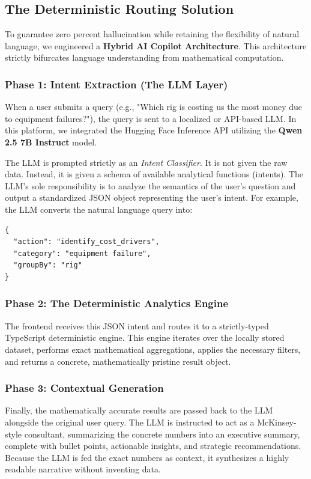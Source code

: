 \documentclass[11pt,a4paper]{article}
\begin{document}
\subsection{The Deterministic Routing Solution}
To guarantee zero percent hallucination while retaining the flexibility of natural language, we engineered a \textbf{Hybrid AI Copilot Architecture}. This architecture strictly bifurcates language understanding from mathematical computation.

\subsubsection{Phase 1: Intent Extraction (The LLM Layer)}
When a user submits a query (e.g., "Which rig is costing us the most money due to equipment failures?"), the query is sent to a localized or API-based LLM. In this platform, we integrated the Hugging Face Inference API utilizing the \textbf{Qwen 2.5 7B Instruct} model. 

The LLM is prompted strictly as an \textit{Intent Classifier}. It is not given the raw data. Instead, it is given a schema of available analytical functions (intents). The LLM's sole responsibility is to analyze the semantics of the user's question and output a standardized JSON object representing the user's intent. 
For example, the LLM converts the natural language query into:
\begin{verbatim}
{
  "action": "identify_cost_drivers",
  "category": "equipment failure",
  "groupBy": "rig"
}
\end{verbatim}

\subsubsection{Phase 2: The Deterministic Analytics Engine}
The frontend receives this JSON intent and routes it to a strictly-typed TypeScript deterministic engine. This engine iterates over the locally stored dataset, performs exact mathematical aggregations, applies the necessary filters, and returns a concrete, mathematically pristine result object.

\subsubsection{Phase 3: Contextual Generation}
Finally, the mathematically accurate results are passed back to the LLM alongside the original user query. The LLM is instructed to act as a McKinsey-style consultant, summarizing the concrete numbers into an executive summary, complete with bullet points, actionable insights, and strategic recommendations. Because the LLM is fed the exact numbers as context, it synthesizes a highly readable narrative without inventing data.
\end{document}

